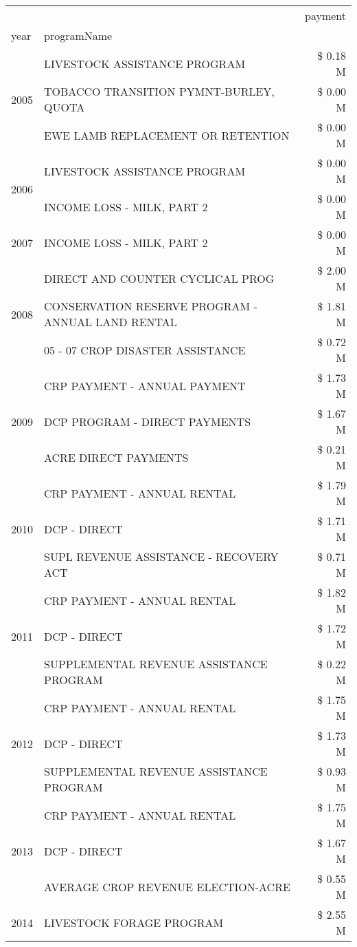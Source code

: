 \begin{tabular}{llr}
\toprule
 &  & payment \\
year & programName &  \\
\midrule
\multirow[t]{3}{*}{2005} & LIVESTOCK ASSISTANCE PROGRAM & \$ 0.18 M \\
 & TOBACCO TRANSITION PYMNT-BURLEY, QUOTA & \$ 0.00 M \\
 & EWE LAMB REPLACEMENT OR RETENTION & \$ 0.00 M \\
\cline{1-3}
\multirow[t]{2}{*}{2006} & LIVESTOCK ASSISTANCE PROGRAM & \$ 0.00 M \\
 & INCOME LOSS - MILK, PART 2 & \$ 0.00 M \\
\cline{1-3}
2007 & INCOME LOSS - MILK, PART 2 & \$ 0.00 M \\
\cline{1-3}
\multirow[t]{3}{*}{2008} & DIRECT AND COUNTER CYCLICAL PROG & \$ 2.00 M \\
 & CONSERVATION RESERVE PROGRAM - ANNUAL LAND RENTAL & \$ 1.81 M \\
 & 05 - 07 CROP DISASTER ASSISTANCE & \$ 0.72 M \\
\cline{1-3}
\multirow[t]{3}{*}{2009} & CRP PAYMENT - ANNUAL PAYMENT & \$ 1.73 M \\
 & DCP PROGRAM - DIRECT PAYMENTS & \$ 1.67 M \\
 & ACRE DIRECT PAYMENTS & \$ 0.21 M \\
\cline{1-3}
\multirow[t]{3}{*}{2010} & CRP PAYMENT - ANNUAL RENTAL & \$ 1.79 M \\
 & DCP - DIRECT & \$ 1.71 M \\
 & SUPL REVENUE ASSISTANCE - RECOVERY ACT & \$ 0.71 M \\
\cline{1-3}
\multirow[t]{3}{*}{2011} & CRP PAYMENT - ANNUAL RENTAL & \$ 1.82 M \\
 & DCP - DIRECT & \$ 1.72 M \\
 & SUPPLEMENTAL REVENUE ASSISTANCE PROGRAM & \$ 0.22 M \\
\cline{1-3}
\multirow[t]{3}{*}{2012} & CRP PAYMENT - ANNUAL RENTAL & \$ 1.75 M \\
 & DCP - DIRECT & \$ 1.73 M \\
 & SUPPLEMENTAL REVENUE ASSISTANCE PROGRAM & \$ 0.93 M \\
\cline{1-3}
\multirow[t]{3}{*}{2013} & CRP PAYMENT - ANNUAL RENTAL & \$ 1.75 M \\
 & DCP - DIRECT & \$ 1.67 M \\
 & AVERAGE CROP REVENUE ELECTION-ACRE & \$ 0.55 M \\
\cline{1-3}
\multirow[t]{3}{*}{2014} & LIVESTOCK FORAGE PROGRAM & \$ 2.55 M \\

\end{tabular}
